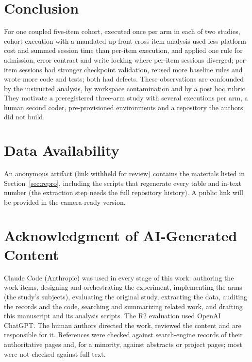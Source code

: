 \documentclass[10pt,conference]{IEEEtran}
\begin{document}
\section{Conclusion}\label{sec:conclusion}

For one coupled five-item cohort, executed once per arm in each of two studies, cohort execution with a mandated up-front cross-item analysis used less platform cost and summed session time than per-item execution, and applied one rule for admission, error contract and write locking where per-item sessions diverged; per-item sessions had stronger checkpoint validation, reused more baseline rules and wrote more code and tests; both had defects. %
These observations are confounded by the instructed analysis, by workspace contamination and by a post hoc rubric. They motivate a preregistered three-arm study with several executions per arm, a human second coder, pre-provisioned environments and a repository the authors did not build.

\section*{Data Availability}
An anonymous artifact (link withheld for review) contains the materials listed in Section~\ref{sec:repro}, including the scripts that regenerate every table and in-text number (the extraction step needs the full repository history). A public link will be provided in the camera-ready version.

\section*{Acknowledgment of AI-Generated Content}
Claude Code (Anthropic) was used in every stage of this work: authoring the work items, designing and orchestrating the experiment, implementing the arms (the study's subjects), evaluating the original study, extracting the data, auditing the records and the code, searching and summarizing related work, and drafting this manuscript and its analysis scripts. The R2 evaluation used OpenAI ChatGPT. The human authors directed the work, reviewed the content and are responsible for it. References were checked against search-engine records of their authoritative pages and, for a minority, against abstracts or project pages; most were not checked against full text.



\end{document}
